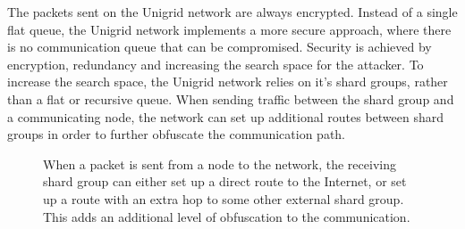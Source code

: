 \documentclass[10pt,a4paper,final]{article}
\begin{document}
The packets sent on the Unigrid network are always encrypted. Instead of a single flat queue, the Unigrid network implements a more secure approach, where there is no communication queue that can be compromised. Security is achieved by encryption, redundancy and increasing the search space for the attacker. To increase the search space, the Unigrid network relies on it's shard groups, rather than a flat or recursive queue. When sending traffic between the shard group and a communicating node, the network can set up additional routes between shard groups in order to further obfuscate the communication path.

\begin{figure}[H]
\centering
	\caption{When a packet is sent from a node to the network, the receiving shard group can either set up a direct route to the Internet, or set up a route with an extra hop to some other external shard group. This adds an additional level of obfuscation to the communication.}
\end{figure}
\end{document}
